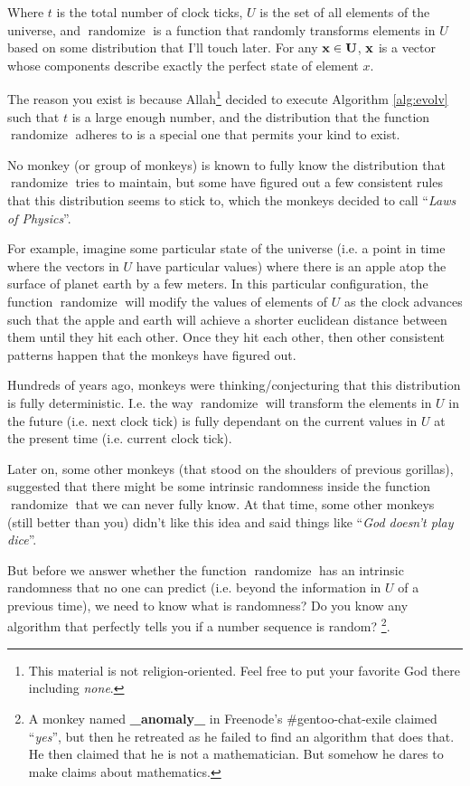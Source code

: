 \documentclass{report}
\DeclareMathOperator{\randomize}{randomize}
\begin{document}
Where $t$ is the total number of clock ticks, $U$ is the set of all elements of
the universe, and $\randomize$ is a function that randomly transforms elements
in $U$ based on some distribution that I'll touch later. For any $\bf{x} \in
U$, $\bf{x}$ is a vector whose components describe exactly the perfect state of
element $x$.

The reason you exist is because Allah\footnote{This material is not
religion-oriented. Feel free to put your favorite God there including
\emph{none}.} decided to execute Algorithm \ref{alg:evolv} such that $t$ is a
large enough number, and the distribution that the function $\randomize$
adheres to is a special one that permits your kind to exist.

No monkey (or group of monkeys) is known to fully know the distribution that
$\randomize$ tries to maintain, but some have figured out a few consistent
rules that this distribution seems to stick to, which the monkeys decided to
call ``\emph{Laws of Physics}''.

For example, imagine some particular state of the universe (i.e. a point in
time where the vectors in $U$ have particular values) where there is an apple
atop the surface of planet earth by a few meters. In this particular
configuration, the function $\randomize$ will modify the values of elements of
$U$ as the clock advances such that the apple and earth will achieve a shorter
euclidean distance between them until they hit each other. Once they hit each
other, then other consistent patterns happen that the monkeys have figured out.

Hundreds of years ago, monkeys were thinking/conjecturing that
this distribution is fully deterministic. I.e. the way $\randomize$ will
transform the elements in $U$ in the future (i.e. next clock tick) is fully
dependant on the current values in $U$ at the present time (i.e. current clock
tick).

Later on, some other monkeys (that stood on the shoulders of previous gorillas),
suggested that there might be some intrinsic randomness inside the function
$\randomize$ that we can never fully know. At that time, some other monkeys
(still better than you) didn't like this idea and said things like ``\emph{God
doesn't play dice}''.

But before we answer whether the function $\randomize$ has an intrinsic
randomness that no one can predict (i.e. beyond the information in $U$ of a
previous time), we need to know what is randomness? Do you know any algorithm
that perfectly tells you if a number sequence is random?  \footnote{A monkey
named \textbf{\_anomaly\_} in Freenode's \#gentoo-chat-exile claimed
``\emph{yes}'', but then he retreated as he failed to find an algorithm that
does that. He then claimed that he is not a mathematician. But somehow he dares
to make claims about mathematics.}.
\end{document}
